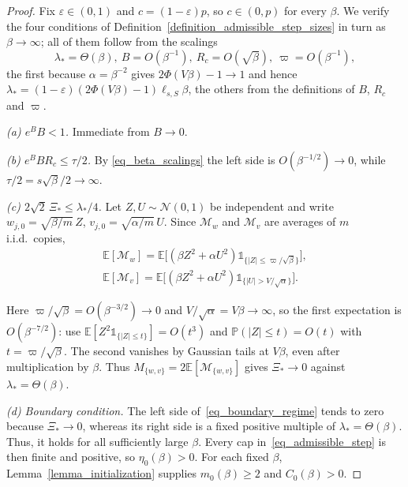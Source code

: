 \documentclass[letterpaper, 10 pt, conference]{ieeeconf}
\newcommand{\E}{\mathbb{E}}
\newcommand{\Prob}{\mathbb{P}}
\newcommand{\cM}{\mathcal{M}}
\newcommand{\cN}{\mathcal{N}}
\newcommand{\ind}[1]{\mathds{1}_{#1}}
\newcommand{\Lemm}{Lemma}
\newcommand{\Defn}{Definition}
\begin{document}
\begin{proof}
    Fix $\varepsilon \in (0,1)$ and $c = (1-\varepsilon)p$, so $c \in (0,p)$ for every $\beta$. We
    verify the four conditions of \Defn~\ref{definition_admissible_step_sizes} in turn as $\beta \to \infty$;
    all of them follow from the scalings
    \begin{equation} \label{eq_beta_scalings}
        \lambda_{\ast} {=} \Theta(\beta),
        \ 
        B {=} O(\beta^{-1}),
        \ 
        R_{c} {=} O(\sqrt{\beta}),
        \
        \varpi {=} O(\beta^{-1}),
    \end{equation}
    the first because $\alpha = \beta^{-2}$ gives $2\Phi(V\beta)-1 \to 1$ and hence
    $\lambda_{\ast} = (1-\varepsilon)(2\Phi(V\beta)-1)\ell_{s,S}\beta$, the others from the
    definitions of $B$, $R_{c}$ and $\varpi$.

    \emph{(a) $e^{B}B<1$.} Immediate from $B \to 0$.

    \emph{(b) $e^{B}BR_{c} \le \tau/2$.} By \eqref{eq_beta_scalings} the left side is
    $O(\beta^{-1/2}) \to 0$, while $\tau/2 = s\sqrt{\beta}/2 \to \infty$.

    \emph{(c) $2\sqrt{2}\,\Xi_{\ast} \le \lambda_{\ast}/4$.} Let $Z,U \sim \cN(0,1)$ be independent
    and write $w_{j,0} = \sqrt{\beta/m}\,Z$, $v_{j,0} = \sqrt{\alpha/m}\,U$. Since $\cM_{w}$ and
    $\cM_{v}$ are averages of $m$ i.i.d.\ copies,
    \begin{equation}
        \begin{gathered}
            \E[\cM_{w}] {=} \E\bigl[(\beta Z^{2} {+} \alpha U^{2}) \ind{ \{ |Z| \le \varpi/\sqrt{\beta} \}}\bigr],
            \\
            \E[\cM_{v}] {=} \E\bigl[(\beta Z^{2} {+} \alpha U^{2}) \ind{ \{ |U| > V/\sqrt{\alpha} \}}\bigr].
        \end{gathered}
    \end{equation}
    
    Here $\varpi/\sqrt{\beta} = O(\beta^{-3/2}) \to 0$ and $V/\sqrt{\alpha} = V\beta \to \infty$, so
    the first expectation is $O(\beta^{-7/2})$: use $\E[Z^2\ind{\{|Z|\le t\}}]=O(t^3)$ and $\Prob(|Z|\le t)=O(t)$ with $t=\varpi/\sqrt\beta$. The second vanishes by Gaussian tails at $V\beta$, even after multiplication by $\beta$. Thus $M_{\{w,v\}}=2\E[\cM_{\{w,v\}}]$ gives $\Xi_{\ast} \to 0$
    against $\lambda_{\ast} = \Theta(\beta)$.

    \emph{(d) Boundary condition.} The left side of~\eqref{eq_boundary_regime} tends to zero because $\Xi_{\ast}\to0$, whereas its right side is a fixed positive multiple of $\lambda_{\ast}=\Theta(\beta)$. Thus, it holds for all sufficiently large $\beta$. Every cap in~\eqref{eq_admissible_step} is then finite and positive, so $\eta_0(\beta)>0$. For each fixed $\beta$, \Lemm~\ref{lemma_initialization} supplies $m_0(\beta)\ge2$ and $C_0(\beta)>0$.
\end{proof}
\end{document}
